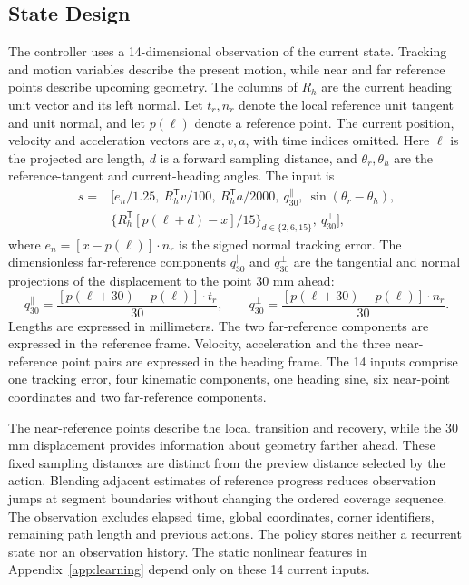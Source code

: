 \documentclass[pdflatex,sn-apa]{sn-jnl}
\begin{document}
\subsection{State Design}
The controller uses a 14-dimensional observation of the current state. Tracking and motion variables describe the present motion, while near and far reference points describe upcoming geometry. The columns of $R_h$ are the current heading unit vector and its left normal. Let $t_r,n_r$ denote the local reference unit tangent and unit normal, and let $p(\ell)$ denote a reference point. The current position, velocity and acceleration vectors are $x,v,a$, with time indices omitted. Here $\ell$ is the projected arc length, $d$ is a forward sampling distance, and $\theta_r,\theta_h$ are the reference-tangent and current-heading angles. The input is
\begin{equation}
\begin{split}
s={}&[e_n/1.25,\ R_h^{\mathsf T}v/100,\ R_h^{\mathsf T}a/2000,\ q_{30}^{\parallel},\ \sin(\theta_r-\theta_h),\\
&\{R_h^{\mathsf T}[p(\ell+d)-x]/15\}_{d\in\{2,6,15\}},\ q_{30}^{\perp}],
\end{split}
\label{eq:state14}
\end{equation}
where $e_n=[x-p(\ell)]\cdot n_r$ is the signed normal tracking error. The dimensionless far-reference components $q_{30}^{\parallel}$ and $q_{30}^{\perp}$ are the tangential and normal projections of the displacement to the point 30 mm ahead:
\begin{equation}
q_{30}^{\parallel}=\frac{[p(\ell+30)-p(\ell)]\cdot t_r}{30},\qquad
q_{30}^{\perp}=\frac{[p(\ell+30)-p(\ell)]\cdot n_r}{30}.
\end{equation}
Lengths are expressed in millimeters. The two far-reference components are expressed in the reference frame. Velocity, acceleration and the three near-reference point pairs are expressed in the heading frame. The 14 inputs comprise one tracking error, four kinematic components, one heading sine, six near-point coordinates and two far-reference components.

The near-reference points describe the local transition and recovery, while the 30 mm displacement provides information about geometry farther ahead. These fixed sampling distances are distinct from the preview distance selected by the action. Blending adjacent estimates of reference progress reduces observation jumps at segment boundaries without changing the ordered coverage sequence. The observation excludes elapsed time, global coordinates, corner identifiers, remaining path length and previous actions. The policy stores neither a recurrent state nor an observation history. The static nonlinear features in Appendix~\ref{app:learning} depend only on these 14 current inputs.
\end{document}
